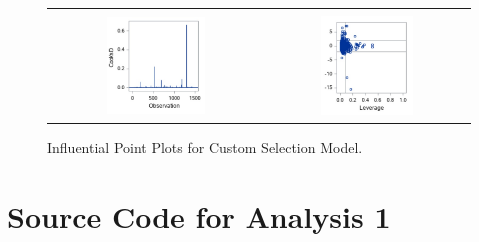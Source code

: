\documentclass[11pt]{scrartcl} %
\begin{document}
\begin{figure}[H] %
	\centering
	\begin{tabular}{p{} p{}}
\hline	
	\multicolumn{1}{|c}{} &  \multicolumn{1}{c|}{} \\
		\multicolumn{1}{|c}{\includegraphics[width=0.48\textwidth]{../graphics/A2Custcooks}} &
		\multicolumn{1}{c|}{\includegraphics[width=0.48\textwidth]{../graphics/A2Custlev}}\\
		\hline
	\end{tabular}		
	\caption{Influential Point Plots for Custom Selection Model.}
	\label{fig:A2CustomIP}
\end{figure}
\pagebreak

\section{Source Code for Analysis 1}
\label{sec:Analysis1}

\end{document}
